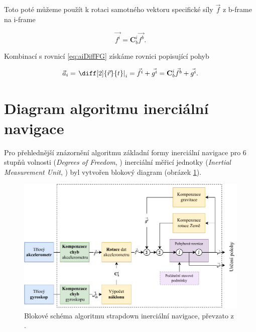 Toto poté můžeme použít k rotaci samotného vektoru specifické síly $ \vec{f} $ z b-frame na i-frame

\begin{equation}
\vec{f^{i}} = \mathbf{C}_{b}^{i}\vec{f^{b}} .
\end{equation}

Kombinací s rovnicí \ref{eq:aiDiffFG} získáme rovnici popisující pohyb

\begin{equation}
\vec{a}_{i} = \left. \diff[2]{\vec{r}}{t} \right|_{i} = \vec{f^{i}} + \vec{g^{i}} = \mathbf{C}_{b}^{i}\vec{f^{b}} + \vec{g^{i}} .
\end{equation}
\section{Diagram algoritmu inerciální navigace}
Pro přehlednější znázornění algoritmu základní formy inerciální navigace pro 6 stupňů volnosti (\emph{Degrees
of Freedom}, ) inerciální měřicí jednotky (\emph{Inertial Measurement Unit}, ) byl vytvořen blokový diagram (obrázek \ref{StrapdownBlock}).

\begin{figure}[h]
    \centering
    \includegraphics[width=\textwidth]{obrazky/StrapdownBlock}
    \caption{Blokové schéma algoritmu strapdown inerciální navigace, převzato z \cite{Tittertonc2004} \cite{Grewal2013}. }
    \label{StrapdownBlock}
\end{figure}
